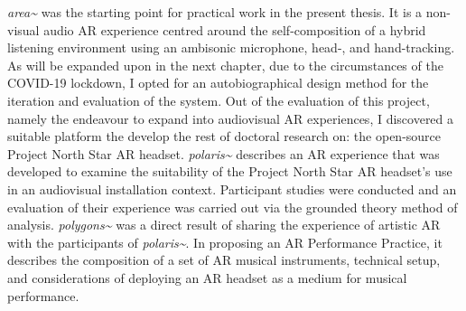 \textit{area\textasciitilde{}} was the starting point for practical work in the present thesis. It is a non-visual audio AR experience centred around the self-composition of a hybrid listening environment using an ambisonic microphone, head-, and hand-tracking. As will be expanded upon in the next chapter, due to the circumstances of the COVID-19 lockdown, I opted for an autobiographical design method for the iteration and evaluation of the system. Out of the evaluation of this project, namely the endeavour to expand into audiovisual AR experiences, I discovered a suitable platform the develop the rest of doctoral research on: the open-source Project North Star AR headset. \textit{polaris\textasciitilde{}} describes an AR experience that was developed to examine the suitability of the Project North Star AR headset's use in an audiovisual installation context. Participant studies were conducted and an evaluation of their experience was carried out via the grounded theory method of analysis. \textit{polygons\textasciitilde{}} was a direct result of sharing the experience of artistic AR with the participants of \textit{polaris\textasciitilde{}}. In proposing an AR Performance Practice, it describes the composition of a set of AR musical instruments, technical setup, and considerations of deploying an AR headset as a medium for musical performance.
